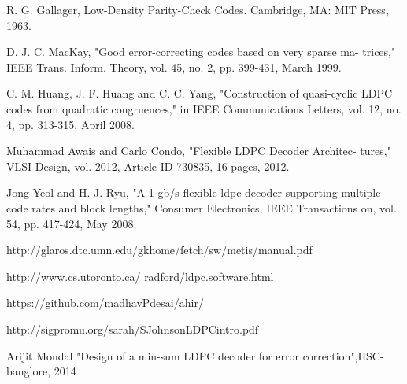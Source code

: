 \documentclass[12pt, a4paper, oneside]{book}
\begin{document}



\label{Bibliography}


\begin{thebibliography}{9}
R. G. Gallager, Low-Density Parity-Check Codes. Cambridge, MA: MIT
Press, 1963.
 
D. J. C. MacKay, "Good error-correcting codes based on very sparse ma-
trices," IEEE Trans. Inform. Theory, vol. 45, no. 2, pp. 399-431, March
1999.
 
C. M. Huang, J. F. Huang and C. C. Yang, "Construction of quasi-cyclic
LDPC codes from quadratic congruences," in IEEE Communications
Letters, vol. 12, no. 4, pp. 313-315, April 2008.

Muhammad Awais and Carlo Condo, "Flexible LDPC Decoder Architec-
tures," VLSI Design, vol. 2012, Article ID 730835, 16 pages, 2012.

Jong-Yeol and H.-J. Ryu, "A 1-gb/s flexible ldpc decoder supporting
multiple code rates and block lengths," Consumer Electronics, IEEE
Transactions on, vol. 54, pp. 417-424, May 2008.

http://glaros.dtc.umn.edu/gkhome/fetch/sw/metis/manual.pdf 


http://www.cs.utoronto.ca/ radford/ldpc.software.html

https://github.com/madhavPdesai/ahir/

http://sigpromu.org/sarah/SJohnsonLDPCintro.pdf

Arijit Mondal "Design of a min-sum LDPC decoder for error correction",IISC-banglore, 2014
\end{thebibliography}
\clearpage

\end{document}
